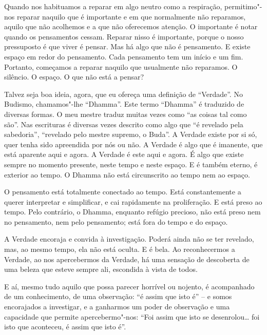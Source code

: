 Quando nos habituamos a reparar em algo neutro como a respiração, permitimo"-nos
reparar naquilo que é importante e em que normalmente não reparamos, aquilo que
não acolhemos e a que não oferecemos atenção. O importante é notar quando os
pensamentos cessam. Reparar nisso é importante, porque o nosso pressuposto é que
viver é pensar. Mas há algo que não é pensamento. E existe espaço em redor do
pensamento. Cada pensamento tem um início e um fim. Portanto, começamos a
reparar naquilo que usualmente não reparamos. O silêncio. O espaço. O que não
está a pensar?

Talvez seja boa ideia, agora, que eu ofereça uma definição de ``Verdade''. No
Budismo, chamamos"-lhe ``Dhamma''. Este termo ``Dhamma'' é traduzido de diversas
formas. O meu mestre traduz muitas vezes como ``as coisas tal como são''. Nas
escrituras é diversas vezes descrito como algo que ``é revelado pela
sabedoria'', ``revelado pelo mestre supremo, o Buda''. A Verdade existe por si
só, quer tenha sido apreendida por nós ou não. A Verdade é algo que é imanente,
que está aparente aqui e agora. A Verdade é este aqui e agora. É algo que existe
sempre no momento presente, neste tempo e neste espaço. E é também eterno, é
exterior ao tempo. O Dhamma não está circunscrito ao tempo nem ao espaço.

O pensamento está totalmente conectado ao tempo. Está constantemente a querer
interpretar e simplificar, e cai rapidamente na proliferação. E está preso ao
tempo. Pelo contrário, o Dhamma, enquanto refúgio precioso, não está preso nem
no pensamento, nem pelo pensamento; está fora do tempo e do espaço.

\enlargethispage{\baselineskip}

A Verdade encoraja e convida à investigação. Poderá ainda não se ter revelado,
mas, ao mesmo tempo, ela não está oculta. E é bela. Ao reconhecermos a Verdade,
ao nos apercebermos da Verdade, há uma sensação de descoberta de uma beleza que
esteve sempre ali, escondida à vista de todos.

E aí, mesmo tudo aquilo que possa parecer horrível ou nojento, é acompanhado de
um conhecimento, de uma observação: ``é assim que isto é'' -- e somos encorajados
a investigar, e a ganharmos um poder de observação e uma capacidade que permite
apercebermo"-nos: ``Foi assim que isto se desenrolou\ldots{} foi isto que
aconteceu, é assim que isto é''.

